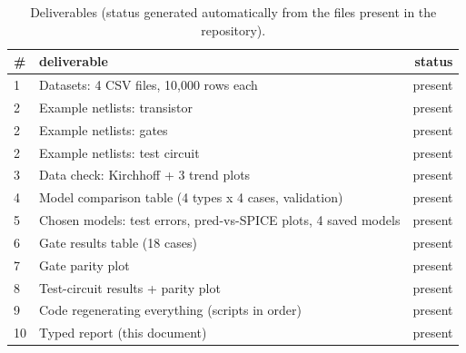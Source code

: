 \begin{table}[H]
\centering
{\small
\begin{tabular}{llr}
\toprule
\# & deliverable & status \\
\midrule
1 & Datasets: 4 CSV files, 10,000 rows each & present \\
2 & Example netlists: transistor & present \\
2 & Example netlists: gates & present \\
2 & Example netlists: test circuit & present \\
3 & Data check: Kirchhoff + 3 trend plots & present \\
4 & Model comparison table (4 types x 4 cases, validation) & present \\
5 & Chosen models: test errors, pred-vs-SPICE plots, 4 saved models & present \\
6 & Gate results table (18 cases) & present \\
7 & Gate parity plot & present \\
8 & Test-circuit results + parity plot & present \\
9 & Code regenerating everything (scripts in order) & present \\
10 & Typed report (this document) & present \\
\bottomrule
\end{tabular}
}
\caption{Deliverables (status generated automatically from the files present in the repository).}
\label{tab:deliv}
\end{table}

